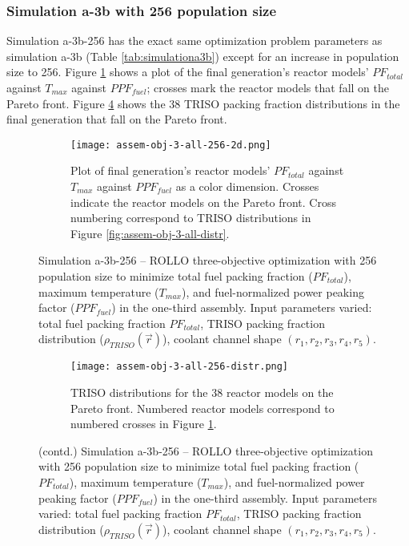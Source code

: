 \subsubsection{Simulation a-3b with 256 population size}
Simulation a-3b-256 has the exact same optimization problem parameters as simulation 
a-3b (Table \ref{tab:simulationa3b}) except for an increase in population size to 256. 
Figure \ref{fig:assem-obj-3-all-256-2d} shows a plot of the final generation's reactor 
models' $PF_{total}$ against $T_{max}$ against $PPF_{fuel}$; crosses mark the reactor 
models that fall on the Pareto front.
Figure \ref{fig:assem-obj-3-all-256-distr} shows the 38 TRISO packing fraction 
distributions in the final generation that fall on the Pareto front. 
\begin{figure}[htbp!]
    \begin{subfigure}{\textwidth}
        \centering
        \texttt{[image: assem-obj-3-all-256-2d.png]}
        \caption{Plot of final generation's reactor models' $PF_{total}$ against 
        $T_{max}$ against $PPF_{fuel}$ as a color dimension. 
        Crosses indicate the reactor models on the 
        Pareto front. Cross numbering correspond to TRISO distributions in Figure 
        \ref{fig:assem-obj-3-all-distr}.}
        \label{fig:assem-obj-3-all-256-2d} 
    \end{subfigure}
    \caption{Simulation a-3b-256 -- ROLLO three-objective optimization with 
    256 population size to minimize total fuel packing fraction ($PF_{total}$), 
    maximum temperature ($T_{max}$), and fuel-normalized power peaking factor 
    ($PPF_{fuel}$) in the one-third assembly. 
    Input parameters varied: total fuel packing fraction $PF_{total}$, 
    TRISO packing fraction distribution ($\rho_{TRISO}(\vec{r})$), 
    coolant channel shape $(r_1, r_2, r_3, r_4, r_5)$.}
    \label{fig:assem-obj-3-all-256}
\end{figure}
\begin{figure}[htbp!]
    \ContinuedFloat
    \begin{subfigure}{\textwidth}
        \centering
        \texttt{[image: assem-obj-3-all-256-distr.png]}
        \caption{TRISO distributions for the 38 reactor models on the Pareto front.
        Numbered reactor models correspond to numbered crosses in Figure 
        \ref{fig:assem-obj-3-all-256-2d}. }
        \label{fig:assem-obj-3-all-256-distr} 
    \end{subfigure}
    \caption{(contd.) Simulation a-3b-256 -- ROLLO three-objective optimization with 
    256 population size to minimize total fuel packing fraction ($PF_{total}$), 
    maximum temperature ($T_{max}$), and fuel-normalized power peaking factor 
    ($PPF_{fuel}$) in the one-third assembly. 
    Input parameters varied: total fuel packing fraction $PF_{total}$, 
    TRISO packing fraction distribution ($\rho_{TRISO}(\vec{r})$), 
    coolant channel shape $(r_1, r_2, r_3, r_4, r_5)$.}
\end{figure}

